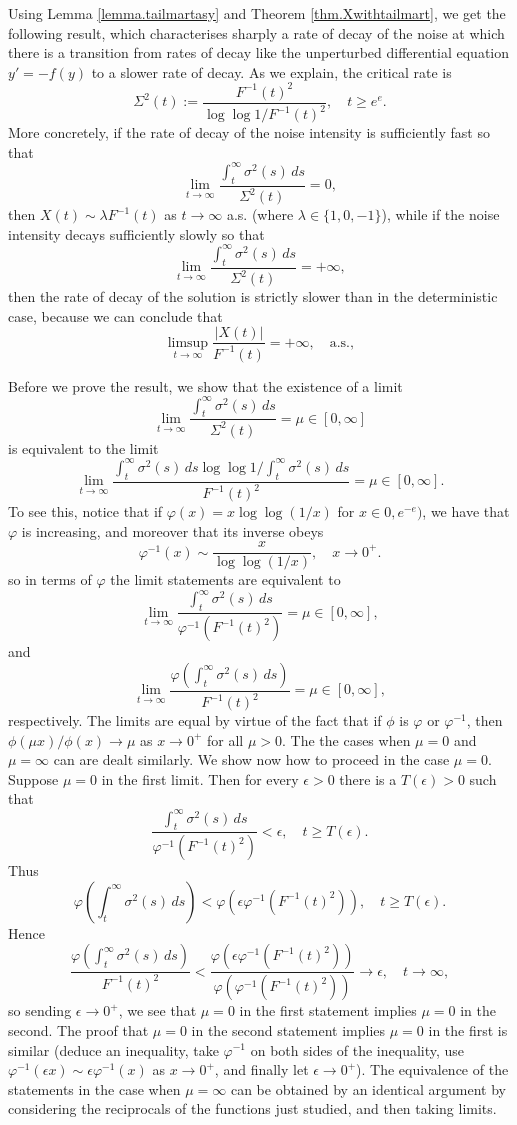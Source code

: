 \documentclass[a4paper,10pt,reqno]{amsart}
\numberwithin{equation}{section}
\theoremstyle{definition}
\theoremstyle{remark}
\DeclareMathOperator{\1}{\mathbbm 1}
\begin{document}
	Using Lemma \ref{lemma.tailmartasy} and Theorem \ref{thm.Xwithtailmart}, we get the following result, which characterises sharply a rate of decay of the noise at which there is a transition from rates of decay like the unperturbed differential equation $y'=-f(y)$ to a slower rate of decay. 
	As we explain, the critical rate is  
	\[
	\Sigma^2(t):=\frac{F^{-1}(t)^2}{ \log\log 1/F^{-1}(t)^2}, \quad t\geq e^e.
	\] 
	More concretely, if the rate of decay of the noise intensity is sufficiently fast so that 
	\[
	\lim_{t\to\infty} \frac{\int_t^\infty \sigma^2(s)\,ds}{\Sigma^2(t)} = 0, 
	\]
	then $X(t)\sim \lambda F^{-1}(t)$ as $t\to\infty$ a.s. (where $\lambda\in \{1,0,-1\}$), while if the noise intensity decays sufficiently slowly so that 
	\[
	\lim_{t\to\infty} \frac{\int_t^\infty \sigma^2(s)\,ds}{\Sigma^2(t)} = +\infty, 
	\] 
	then the rate of decay of the solution is strictly slower than in the deterministic case, because we can conclude that 
	\[
	\limsup_{t\to\infty} \frac{|X(t)|}{F^{-1}(t)}=+\infty, \quad \text{a.s.},
	\]
	
	Before we prove the result, we show that the existence of a limit 
	\[
	\lim_{t\to\infty} \frac{\int_t^\infty \sigma^2(s)\,ds}{\Sigma^2(t)}=\mu \in [0,\infty]
	\]
	is equivalent to the limit
	\[
	\lim_{t\to\infty} \frac{\int_t^\infty \sigma^2(s)\,ds\log\log 1/\int_t^\infty \sigma^2(s)\,ds}{F^{-1}(t)^2}=\mu \in [0,\infty].
	\]
	To see this, notice that if $\varphi(x)=x\log\log(1/x)$ for $x\in 0,e^{-e})$, we have that $\varphi$ is increasing, and moreover that its inverse obeys 
	\[
	\varphi^{-1}(x)\sim \frac{x}{\log\log(1/x)}, \quad x\to 0^+.
	\]
	so in terms of $\varphi$ the limit statements are equivalent to 
	\[
	\lim_{t\to\infty} \frac{\int_t^\infty \sigma^2(s)\,ds}{\varphi^{-1}(F^{-1}(t)^2)}=\mu \in [0,\infty],
	\]
	and
	\[
	\lim_{t\to\infty} \frac{\varphi(\int_t^\infty \sigma^2(s)\,ds)}{F^{-1}(t)^2}=\mu \in [0,\infty],
	\] 
	respectively. The limits are equal by virtue of the fact that 
	if $\phi$ is $\varphi$ or $\varphi^{-1}$, then 
	$\phi(\mu x)/\phi(x)\to \mu$ as $x\to 0^+$ for all $\mu>0$. The  the cases when $\mu=0$ and $\mu=\infty$ can are dealt similarly. We show now how to proceed in the case $\mu=0$. Suppose $\mu=0$ in the first limit. Then for every $\epsilon>0$ there is a $T(\epsilon)>0$ such that 
	\[
	\frac{\int_t^\infty \sigma^2(s)\,ds}{\varphi^{-1}(F^{-1}(t)^2)}<\epsilon, \quad t\geq T(\epsilon). 
	\]
	Thus 
	\[
	\varphi\left(\int_t^\infty \sigma^2(s)\,ds\right)< \varphi(\epsilon \varphi^{-1}(F^{-1}(t)^2)), \quad t\geq T(\epsilon).
	\]
	Hence 
	\[
	\frac{\varphi\left(\int_t^\infty \sigma^2(s)\,ds\right)}{F^{-1}(t)^2}
	< \frac{\varphi(\epsilon \varphi^{-1}(F^{-1}(t)^2))}{\varphi( \varphi^{-1}(F^{-1}(t)^2))}\to \epsilon, \quad t\to\infty,	
	\]
	so sending $\epsilon\to 0^+$, we see that $\mu=0$ in the first statement implies $\mu=0$ in the second. The proof that $\mu=0$ in the second statement implies $\mu=0$ in the first is similar (deduce an inequality,  take $\varphi^{-1}$ on both sides of the inequality, use $\varphi^{-1}(\epsilon x)\sim \epsilon \varphi^{-1}(x)$ as $x\to 0^+$, and finally let $\epsilon\to 0^+$). The equivalence of the statements in the case when $\mu=\infty$ can be obtained by an identical argument by considering the reciprocals of the functions just studied, and then taking limits.  
	
\end{document}
